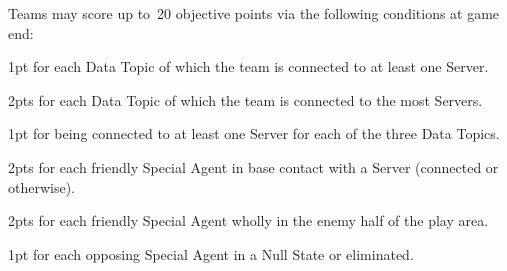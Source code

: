 Teams may score up to~20 objective points via the following conditions
at game end:
\begin{squishitemize}
\item 1pt for each Data Topic of which the team is connected to at
  least one Server.
\item 2pts for each Data Topic of which the team is connected to the
  most Servers.
\item 1pt for being connected to at least one Server for each of the
  three Data Topics.

\item 2pts for each friendly Special Agent in base contact with a
  Server (connected or otherwise).
\item 2pts for each friendly Special Agent wholly in the enemy half of
  the play area.
\item 1pt for each opposing Special Agent in a Null State or
  eliminated.

\end{squishitemize}
